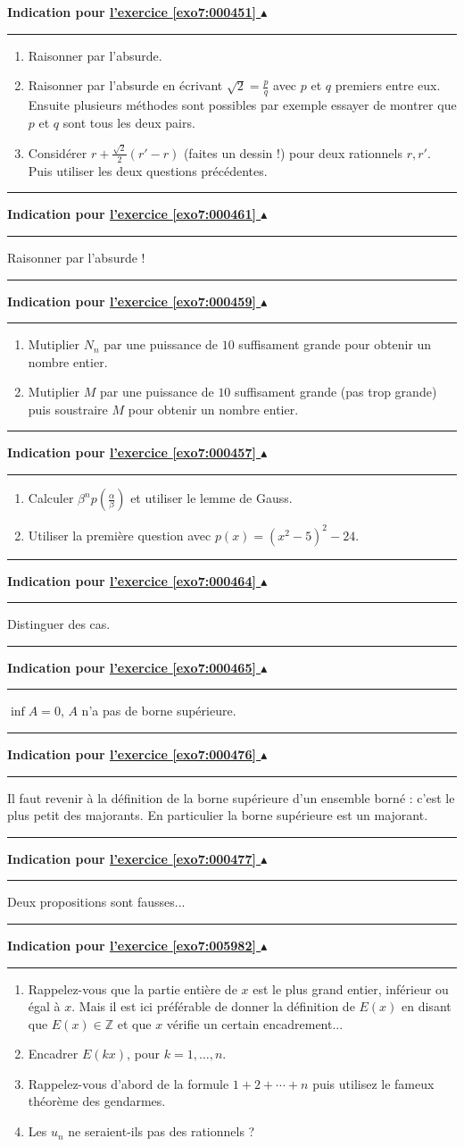\documentclass[11pt,a4paper]{article}
\newcommand{\Zz}{\mathbb{Z}} \newcommand{\Z}{\mathbb{Z}}
\newcommand{\noindication}{}
\newcounter{exo}
\newcommand{\indication}[1]{\hypertarget{ind7:#1}{}\label{ind7:#1}{\bf Indication pour \hyperlink{exo7:#1}{l'exercice \ref{exo7:#1} $\blacktriangle$}}\vspace{1mm}\hrule\vspace{1mm}}
\newcommand{\finindication}{\vspace{1mm}\hrule\vspace*{7mm}}
\begin{document}
\indication{000451}
\begin{enumerate}
  \item Raisonner par l'absurde.
  \item Raisonner par l'absurde en \'ecrivant $\sqrt2=\frac pq$ avec $p$ et $q$ premiers entre eux. Ensuite plusieurs méthodes sont possibles par exemple essayer de montrer que $p$ et $q$ sont tous les deux pairs.
  \item Considérer $r + \frac{\sqrt 2}{2}(r'-r)$ (faites un dessin !) pour deux rationnels $r,r'$. Puis utiliser les deux questions pr\'ec\'edentes.

\end{enumerate}
\finindication
\indication{000461}
Raisonner par l'absurde !
\finindication
\indication{000459}
\begin{enumerate}
  \item Mutiplier $N_n$ par une puissance de $10$ suffisament grande pour obtenir un nombre entier.
  \item Mutiplier $M$ par une puissance de $10$ suffisament grande (pas trop grande) puis soustraire $M$ pour obtenir un nombre entier.
\end{enumerate}
\finindication
\indication{000457}
\begin{enumerate}
  \item Calculer $\beta^n p(\frac \alpha \beta)$ et utiliser le lemme de Gauss.
  \item Utiliser la premi\`ere question avec $p(x)=(x^2-5)^2-24$.

\end{enumerate}
\finindication
\indication{000464}
Distinguer des cas.
\finindication
\indication{000465}
$\inf A =0$, $A$ n'a pas de borne supérieure.
\finindication
\noindication
\indication{000476}
Il faut revenir à la définition de la borne supérieure d'un ensemble borné :
c'est le plus petit des majorants. En particulier la borne supérieure est un majorant.
\finindication
\indication{000477}
Deux propositions sont fausses...
\finindication
\indication{005982}
\begin{enumerate}
 \item Rappelez-vous que la partie entière de $x$ est le plus grand entier, inférieur ou égal à $x$. Mais il est ici préférable de donner la définition de $E(x)$ en disant que $E(x) \in \Zz$ et que $x$ vérifie un certain encadrement...

 \item Encadrer $E(kx)$, pour $k=1,\ldots,n$.

 \item Rappelez-vous d'abord de la formule $1+2+\cdots+n$ puis utilisez le fameux théorème des gendarmes.

 \item Les $u_n$ ne seraient-ils pas des rationnels ? 
\end{enumerate}
\end{document}
